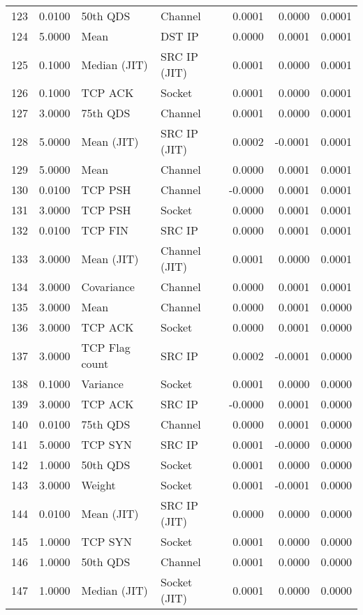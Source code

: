 \begin{longtable}{lrllrrr}
123 & 0.0100 & 50th QDS & Channel & 0.0001 & 0.0000 & 0.0001 \\
124 & 5.0000 & Mean & DST IP & 0.0000 & 0.0001 & 0.0001 \\
125 & 0.1000 & Median (JIT) & SRC IP (JIT) & 0.0001 & 0.0000 & 0.0001 \\
126 & 0.1000 & TCP ACK & Socket & 0.0001 & 0.0000 & 0.0001 \\
127 & 3.0000 & 75th QDS & Channel & 0.0001 & 0.0000 & 0.0001 \\
128 & 5.0000 & Mean (JIT) & SRC IP (JIT) & 0.0002 & -0.0001 & 0.0001 \\
129 & 5.0000 & Mean & Channel & 0.0000 & 0.0001 & 0.0001 \\
130 & 0.0100 & TCP PSH & Channel & -0.0000 & 0.0001 & 0.0001 \\
131 & 3.0000 & TCP PSH & Socket & 0.0000 & 0.0001 & 0.0001 \\
132 & 0.0100 & TCP FIN & SRC IP & 0.0000 & 0.0001 & 0.0001 \\
133 & 3.0000 & Mean (JIT) & Channel (JIT) & 0.0001 & 0.0000 & 0.0001 \\
134 & 3.0000 & Covariance & Channel & 0.0000 & 0.0001 & 0.0001 \\
135 & 3.0000 & Mean & Channel & 0.0000 & 0.0001 & 0.0000 \\
136 & 3.0000 & TCP ACK & Socket & 0.0000 & 0.0001 & 0.0000 \\
137 & 3.0000 & TCP Flag count & SRC IP & 0.0002 & -0.0001 & 0.0000 \\
138 & 0.1000 & Variance & Socket & 0.0001 & 0.0000 & 0.0000 \\
139 & 3.0000 & TCP ACK & SRC IP & -0.0000 & 0.0001 & 0.0000 \\
140 & 0.0100 & 75th QDS & Channel & 0.0000 & 0.0001 & 0.0000 \\
141 & 5.0000 & TCP SYN & SRC IP & 0.0001 & -0.0000 & 0.0000 \\
142 & 1.0000 & 50th QDS & Socket & 0.0001 & 0.0000 & 0.0000 \\
143 & 3.0000 & Weight & Socket & 0.0001 & -0.0001 & 0.0000 \\
144 & 0.0100 & Mean (JIT) & SRC IP (JIT) & 0.0000 & 0.0000 & 0.0000 \\
145 & 1.0000 & TCP SYN & Socket & 0.0001 & 0.0000 & 0.0000 \\
146 & 1.0000 & 50th QDS & Channel & 0.0001 & 0.0000 & 0.0000 \\
147 & 1.0000 & Median (JIT) & Socket (JIT) & 0.0001 & 0.0000 & 0.0000 \\

\end{longtable}
